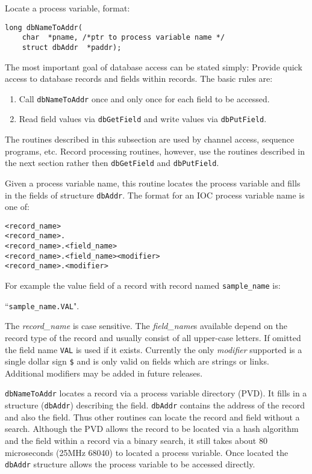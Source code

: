 Locate a process variable, format:

\begin{verbatim}
long dbNameToAddr(
    char  *pname, /*ptr to process variable name */
    struct dbAddr  *paddr);
\end{verbatim}

The most important goal of database access can be stated simply: Provide quick access to database records and fields 
within records. The basic rules are:

\begin{enumerate}

\item Call \verb|dbNameToAddr| once and only once for each field to be accessed.

\item Read field values via \verb|dbGetField| and write values via \verb|dbPutField|.

\end{enumerate}

The routines described in this subsection are used by channel access, sequence programs, etc. Record processing routines, 
however, use the routines described in the next section rather then \verb|dbGetField| and \verb|dbPutField|.

Given a process variable name, this routine locates the process variable and fills in the fields of structure \verb|dbAddr|. The 
format for an IOC process variable name is one of:

\begin{verbatim}
<record_name>
<record_name>.
<record_name>.<field_name>
<record_name>.<field_name><modifier>
<record_name>.<modifier>
\end{verbatim}

For example the value field of a record with record named \verb|sample_name| is:

       ``\verb|sample_name.VAL|".

The \emph{record\_name} is case sensitive. The \emph{field\_name}s available depend on the record type of the record and usually consist 
of all upper-case letters. If omitted the field name \verb|VAL| is used if it exists. Currently the only \emph{modifier} supported is a single 
dollar sign \verb|$| and is only valid on fields which are strings or links. Additional modifiers may be added in future releases.

\verb|dbNameToAddr| locates a record via a process variable directory (PVD). It fills in a structure (\verb|dbAddr|) describing the 
field. \verb|dbAddr| contains the address of the record and also the field. Thus other routines can locate the record and field 
without a search. Although the PVD allows the record to be located via a hash algorithm and the field within a record via 
a binary search, it still takes about 80 microseconds (25MHz 68040) to located a process variable. Once located the 
\verb|dbAddr| structure allows the process variable to be accessed directly.

